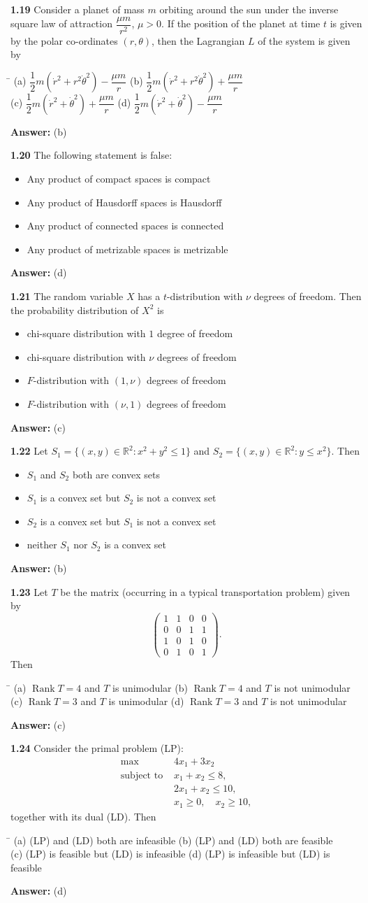 \documentclass[11pt,a4paper]{article}
\newcommand{\optsfour}[4]{%
  \begin{tabbing}
    \hspace{0.48\linewidth}\=\kill
    (a) #1 \> (b) #2 \\[2pt]
    (c) #3 \> (d) #4
  \end{tabbing}%
}
\newcommand{\optslist}[4]{%
  \begin{itemize}
    \setlength{\itemsep}{2pt}\setlength{\parskip}{0pt}
    \item[(a)] #1
    \item[(b)] #2
    \item[(c)] #3
    \item[(d)] #4
  \end{itemize}%
}
\newcommand{\ans}[1]{\textbf{Answer:} #1\par\medskip}
\begin{document}
\textbf{1.19} Consider a planet of mass $m$ orbiting around the sun under the inverse square law of attraction $\dfrac{\mu m}{r^2}$, $\mu > 0$. If the position of the planet at time $t$ is given by the polar co-ordinates $(r, \theta)$, then the Lagrangian $L$ of the system is given by
\optsfour{$\dfrac{1}{2}m(\dot{r}^2 + r^2\dot{\theta}^2) - \dfrac{\mu m}{r}$}{$\dfrac{1}{2}m(\dot{r}^2 + r^2\dot{\theta}^2) + \dfrac{\mu m}{r}$}{$\dfrac{1}{2}m(\dot{r}^2 + \dot{\theta}^2) + \dfrac{\mu m}{r}$}{$\dfrac{1}{2}m(\dot{r}^2 + \dot{\theta}^2) - \dfrac{\mu m}{r}$}
\ans{(b)}

\textbf{1.20} The following statement is false:
\optslist{Any product of compact spaces is compact}{Any product of Hausdorff spaces is Hausdorff}{Any product of connected spaces is connected}{Any product of metrizable spaces is metrizable}
\ans{(d)}

\textbf{1.21} The random variable $X$ has a $t$-distribution with $\nu$ degrees of freedom. Then the probability distribution of $X^2$ is
\optslist{chi-square distribution with $1$ degree of freedom}{chi-square distribution with $\nu$ degrees of freedom}{$F$-distribution with $(1, \nu)$ degrees of freedom}{$F$-distribution with $(\nu, 1)$ degrees of freedom}
\ans{(c)}

\textbf{1.22} Let $S_1 = \{(x,y) \in \mathbb{R}^2 : x^2 + y^2 \le 1\}$ and $S_2 = \{(x,y) \in \mathbb{R}^2 : y \le x^2\}$. Then
\optslist{$S_1$ and $S_2$ both are convex sets}{$S_1$ is a convex set but $S_2$ is not a convex set}{$S_2$ is a convex set but $S_1$ is not a convex set}{neither $S_1$ nor $S_2$ is a convex set}
\ans{(b)}

\textbf{1.23} Let $T$ be the matrix (occurring in a typical transportation problem) given by
\[
  \begin{pmatrix}
    1 & 1 & 0 & 0 \\
    0 & 0 & 1 & 1 \\
    1 & 0 & 1 & 0 \\
    0 & 1 & 0 & 1
  \end{pmatrix}.
\]
Then
\optsfour{$\operatorname{Rank} T = 4$ and $T$ is unimodular}{$\operatorname{Rank} T = 4$ and $T$ is not unimodular}{$\operatorname{Rank} T = 3$ and $T$ is unimodular}{$\operatorname{Rank} T = 3$ and $T$ is not unimodular}
\ans{(c)}

\textbf{1.24} Consider the primal problem (LP):
\begin{align*}
  \max\ & 4x_1 + 3x_2 \\
  \text{subject to } & x_1 + x_2 \le 8, \\
                     & 2x_1 + x_2 \le 10, \\
                     & x_1 \ge 0, \quad x_2 \ge 10,
\end{align*}
together with its dual (LD). Then
\optsfour{(LP) and (LD) both are infeasible}{(LP) and (LD) both are feasible}{(LP) is feasible but (LD) is infeasible}{(LP) is infeasible but (LD) is feasible}
\ans{(d)}
\end{document}
